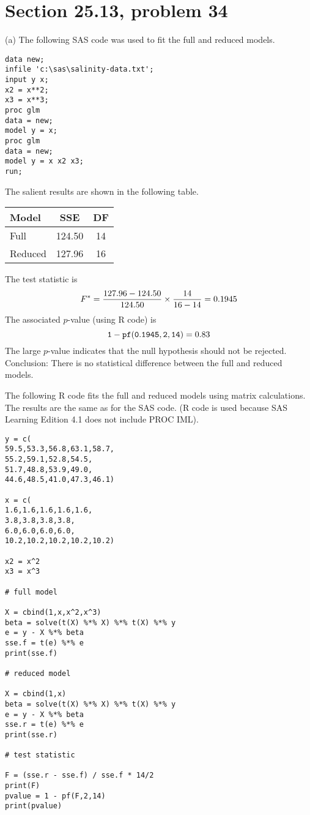 \section{Section 25.13, problem 34}
(a) The following SAS code was used to fit the full and reduced
models.
\begin{verbatim}
data new;
infile 'c:\sas\salinity-data.txt';
input y x;
x2 = x**2;
x3 = x**3;
proc glm
data = new;
model y = x;
proc glm
data = new;
model y = x x2 x3;
run;
\end{verbatim}
The salient results are shown in the following table.

\begin{center}
\begin{tabular}{lcc}
Model & SSE & DF\\
\hline
Full & 124.50 & 14\\
Reduced & 127.96 & 16
\end{tabular}
\end{center}

\noindent
The test statistic is
\[
F^*={127.96-124.50\over124.50}\times{14\over16-14}=0.1945
\]
The associated $p$-value (using R code) is
\[
{\tt 1-pf(0.1945,2,14)}=0.83
\]
The large $p$-value indicates that the null hypothesis should not be rejected.
Conclusion:
There is no statistical difference between the full and reduced
models.

\bigskip
\noindent
The following R code fits the full and reduced models using matrix calculations.
The results are the same as for the SAS code.
(R code is used because SAS Learning Edition 4.1 does not include
PROC IML).

\begin{verbatim}
y = c(
59.5,53.3,56.8,63.1,58.7,
55.2,59.1,52.8,54.5,
51.7,48.8,53.9,49.0,
44.6,48.5,41.0,47.3,46.1)

x = c(
1.6,1.6,1.6,1.6,1.6,
3.8,3.8,3.8,3.8,
6.0,6.0,6.0,6.0,
10.2,10.2,10.2,10.2,10.2)

x2 = x^2
x3 = x^3

# full model

X = cbind(1,x,x^2,x^3)
beta = solve(t(X) %*% X) %*% t(X) %*% y
e = y - X %*% beta
sse.f = t(e) %*% e
print(sse.f)

# reduced model

X = cbind(1,x)
beta = solve(t(X) %*% X) %*% t(X) %*% y
e = y - X %*% beta
sse.r = t(e) %*% e
print(sse.r)

# test statistic

F = (sse.r - sse.f) / sse.f * 14/2
print(F)
pvalue = 1 - pf(F,2,14)
print(pvalue)
\end{verbatim}

